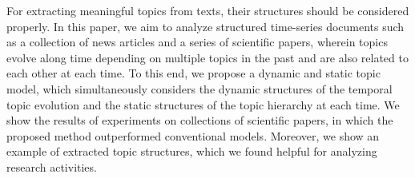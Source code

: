 For extracting meaningful topics from texts, their structures should be considered properly. In this paper, we aim to analyze structured time-series documents such as a collection of news articles and a series of scientific papers, wherein topics evolve along time depending on multiple topics in the past and are also related to each other at each time. To this end, we propose a dynamic and static topic model, which simultaneously considers the dynamic structures of the temporal topic evolution and the static structures of the topic hierarchy at each time. We show the results of experiments on collections of scientific papers, in which the proposed method outperformed conventional models. Moreover, we show an example of extracted topic structures, which we found helpful for analyzing research activities.
